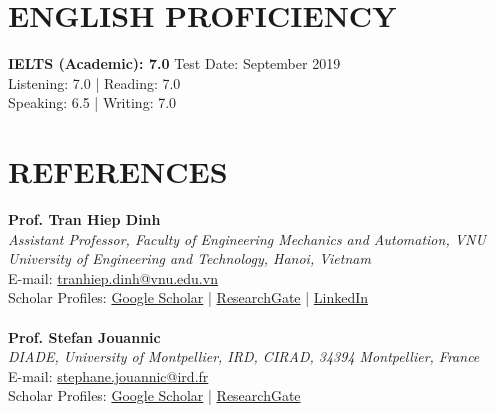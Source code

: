 \documentclass[a4paper,9pt]{extarticle}
\begin{document}
\section*{ENGLISH PROFICIENCY}
\noindent\textbf{IELTS (Academic): 7.0} \hfill Test Date: September 2019\\ 
Listening: 7.0 | Reading: 7.0 \\
Speaking: 6.5 | Writing: 7.0 

\section*{REFERENCES}
\label{sec:references}
\textbf{Prof. Tran Hiep Dinh}\\
\textit{Assistant Professor, Faculty of Engineering Mechanics and Automation, VNU University of Engineering and Technology, Hanoi, Vietnam}\\
E-mail: \href{mailto:tranhiep.dinh@vnu.edu.vn}{tranhiep.dinh@vnu.edu.vn}\\
Scholar Profiles: \href{https://scholar.google.com/citations?user=fJYX_zsAAAAJ&hl=en&oi=ao}{Google Scholar} | \href{https://www.researchgate.net/profile/Tran-Hiep-Dinh}{ResearchGate} | \href{https://www.linkedin.com/in/tran-hiep-dinh/}{LinkedIn}\\ \\
\textbf{Prof. Stefan Jouannic}\\
\textit{DIADE, University of Montpellier, IRD, CIRAD, 34394 Montpellier, France}\\
E-mail: \href{mailto:stephane.jouannic@ird.fr}{stephane.jouannic@ird.fr}\\
Scholar Profiles: \href{https://scholar.google.com/citations?user=y5kP-ZAAAAAJ&hl=vi}{Google Scholar} | \href{https://www.researchgate.net/profile/Stefan-Jouannic}{ResearchGate}\\ \\

\end{document}
